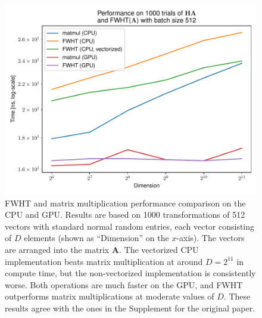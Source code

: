 \begin{figure}[htb]
    \centering
    \includegraphics[width=\hsize]{img/compute-performance-all}
    \caption{
        FWHT and matrix multiplication performance comparison on the CPU and GPU.
        Results are based on 1000 transformations of 512 vectors with standard normal random entries, each vector consisting of $D$ elements (shown as ``Dimension'' on the $x$-axis).
        The vectors are arranged into the matrix $\mathbf{A}$.
        The vectorized CPU implementation beats matrix multiplication at around $D = 2^{11}$ in compute time, but the non-vectorized implementation is consistently worse.
        Both operations are much faster on the GPU, and FWHT outperforms matrix multiplications at moderate values of $D$.
        These results agree with the ones in the Supplement for the original paper.
    }
    \label{fig:compute-performance}
\end{figure}
